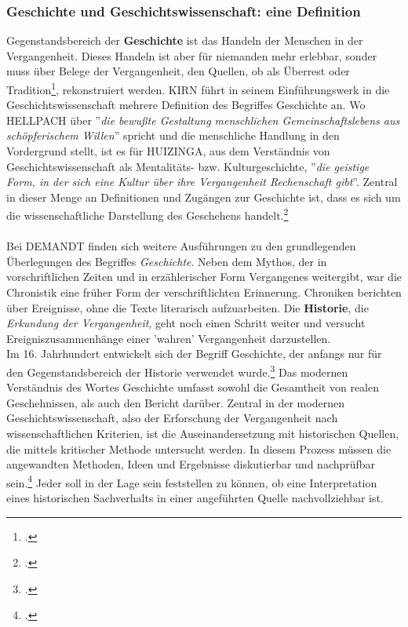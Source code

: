 \documentclass[12pt,a4paper]{article}
\begin{document}
\subsubsection{Geschichte und Geschichtswissenschaft: eine Definition}
Gegenstandsbereich der \textbf{Geschichte} ist das Handeln der Menschen in der Vergangenheit. Dieses Handeln ist aber für niemanden mehr erlebbar, sonder muss über Belege der Vergangenheit, den Quellen, ob als Überrest oder Tradition\footcite[Die Unterscheidung nach DROYSEN zwischen ''unabsichtlich'' erzeugten (z.B. durch eine Ausgrabung gefundene Kleidung) und bewusst überlieferten Quellen (z.B. ein Denkmal),][S.49–55]{schulz2010neuere}, rekonstruiert werden. KIRN führt in seinem Einführungswerk in die Geschichtswissenschaft mehrere Definition des Begriffes Geschichte an. Wo HELLPACH über ''\textit{die bewußte Gestaltung menschlichen Gemeinschaftslebens aus schöpferischem Willen}'' spricht und die menschliche Handlung in den Vordergrund stellt, ist es für HUIZINGA, aus dem Verständnis von Geschichtswissenschaft als  Mentalitäts- bzw. Kulturgeschichte, ''\textit{die geistige Form, in der sich eine Kultur über ihre Vergangenheit Rechenschaft gibt}''. Zentral in dieser Menge an Definitionen und Zugängen zur Geschichte ist, dass es sich um die wissenschaftliche Darstellung des Geschehens handelt.\footcite[][S.7-12]{KirnPaul2015EidG}
\\
\\
Bei DEMANDT finden sich weitere Ausführungen zu den grundlegenden Überlegungen des Begriffes \textit{Geschichte}. Neben dem Mythos, der in vorschriftlichen Zeiten und in erzählerischer Form Vergangenes weitergibt, war die Chronistik eine früher Form der verschriftlichten Erinnerung. Chroniken berichten über Ereignisse, ohne die Texte literarisch aufzuarbeiten. Die \textbf{Historie}, die \textit{Erkundung der Vergangenheit}, geht noch einen Schritt weiter und versucht Ereigniszusammenhänge einer 'wahren' Vergangenheit darzustellen. 
\\
Im 16. Jahrhundert entwickelt sich der Begriff Geschichte, der anfangs nur für den Gegenstandsbereich der Historie verwendet wurde.\footcite[][S.57-58]{schulz2010neuere} Das modernen Verständnis des Wortes Geschichte umfasst sowohl die Gesamtheit von realen Geschehnissen, als auch den Bericht darüber. Zentral in der modernen Geschichtswissenschaft, also der Erforschung der Vergangenheit nach wissenschaftlichen Kriterien, ist die Auseinandersetzung mit historischen Quellen, die mittels kritischer Methode untersucht werden. In diesem Prozess müssen die angewandten Methoden, Ideen und Ergebnisse diskutierbar und nachprüfbar sein.\footcite[][S.13-32]{demand2011philosophie} Jeder soll in der Lage sein feststellen zu können, ob eine Interpretation eines historischen Sachverhalts in einer angeführten Quelle nachvollziehbar ist. 
\end{document}

